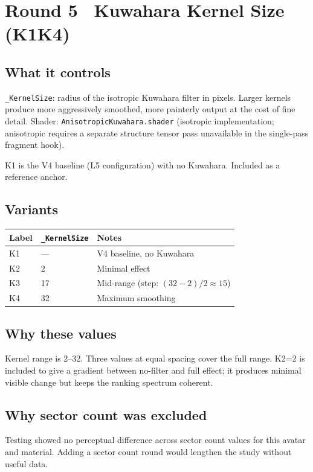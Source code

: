 \documentclass[11pt,a4paper]{article}
\newcommand{\prop}[1]{\texttt{#1}}
\begin{document}
\bigskip

\section*{Round 5 \textemdash\ Kuwahara Kernel Size (K1\textendash K4)}

\subsection*{What it controls}
\prop{\_KernelSize}: radius of the isotropic Kuwahara filter in pixels. Larger kernels produce more aggressively smoothed, more painterly output at the cost of fine detail. Shader: \texttt{AnisotropicKuwahara.shader} (isotropic implementation; anisotropic requires a separate structure tensor pass unavailable in the single-pass fragment hook).

K1 is the V4 baseline (L5 configuration) with no Kuwahara. Included as a reference anchor.

\subsection*{Variants}

\begin{tabular}{lll}
\toprule
\textbf{Label} & \prop{\_KernelSize} & \textbf{Notes} \\
\midrule
K1 & ---  & V4 baseline, no Kuwahara \\
K2 & 2    & Minimal effect \\
K3 & 17   & Mid-range (step: $(32-2)/2 \approx 15$) \\
K4 & 32   & Maximum smoothing \\
\bottomrule
\end{tabular}

\subsection*{Why these values}
Kernel range is 2--32. Three values at equal spacing cover the full range. K2=2 is included to give a gradient between no-filter and full effect; it produces minimal visible change but keeps the ranking spectrum coherent.

\subsection*{Why sector count was excluded}
Testing showed no perceptual difference across sector count values for this avatar and material. Adding a sector count round would lengthen the study without useful data.
\end{document}
